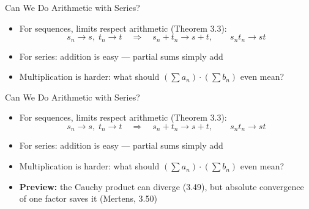 \documentclass[aspectratio=169,12pt,t]{beamer}
\begin{document}
{%
\begin{frame}{Can We Do Arithmetic with Series?}
  \begin{hlbox}
    \begin{itemize}
      \item For \alert{sequences}, limits respect arithmetic (Theorem 3.3):
        \[
          s_n \to s,\; t_n \to t \quad\Longrightarrow\quad
          s_n + t_n \to s + t, \qquad s_n t_n \to st
        \]
      \item For \alert{series}: addition is easy --- partial sums simply add
      \item Multiplication is harder: what should
        $\left(\sum a_n\right)\cdot\left(\sum b_n\right)$ even \alert{mean}?
    \end{itemize}
  \end{hlbox}

\end{frame}

\begin{frame}{Can We Do Arithmetic with Series?}
  \begin{hlbox}
    \begin{itemize}
      \item For \alert{sequences}, limits respect arithmetic (Theorem 3.3):
        \[
          s_n \to s,\; t_n \to t \quad\Longrightarrow\quad
          s_n + t_n \to s + t, \qquad s_n t_n \to st
        \]
      \item For \alert{series}: addition is easy --- partial sums simply add
      \item Multiplication is harder: what should
        $\left(\sum a_n\right)\cdot\left(\sum b_n\right)$ even \alert{mean}?
      \item \textbf{Preview:} the \alert{Cauchy product} can diverge (3.49),
        but \alert{absolute convergence} of one factor saves it (Mertens, 3.50)
    \end{itemize}
  \end{hlbox}


\end{frame}}
\end{document}
